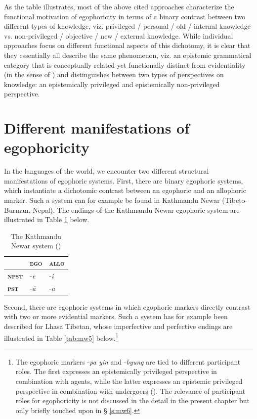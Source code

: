 \documentclass[output=paper]{langsci/langscibook}
\begin{document}
As the table illustrates, most of the above cited approaches characterize the functional motivation of egophoricity in terms of a binary contrast between two different types of knowledge, viz. privileged / personal / old / internal knowledge vs. non-privileged / objective / new / external knowledge. While individual approaches focus on different functional aspects of this dichotomy, it is clear that they essentially all describe the same phenomenon, viz. an epistemic grammatical category that is conceptually related yet functionally distinct from evidentiality (in the sense of \citealt{Aikhenvald2004}) and distinguishes between two types of perspectives on knowledge: an epistemically privileged and epistemically non-privileged perspective.
 
\section{Different manifestations of egophoricity}\label{s:mw3} 

In the languages of the world, we encounter two different structural manifestations of egophoric systems. First, there are binary egophoric systems, which instantiate a dichotomic contrast between an egophoric and an allophoric marker. Such a system can for example be found in Kathmandu Newar (Tibeto-Burman, Nepal). The endings of the Kathmandu Newar egophoric system are illustrated in Table \ref{tab:mw4} below.

\begin{table}
\begin{tabularx}{.70\textwidth}{XXX}
\hline
& \textbf{\textsc{ego}} & \textbf{\textsc{allo}}\\
\hline
\textbf{\textsc{npst}} & -\textit{e} & -\textit{i}\\
\textbf{\textsc{pst}} & -\textit{ā} & -\textit{a}\\
\hline
\end{tabularx}
\caption{The Kathmandu Newar system (\citealt{Hargreaves2005})}
\label{tab:mw4}
\end{table}

Second, there are egophoric systems in which egophoric markers directly contrast with two or more evidential markers. Such a system has for example been described for Lhasa Tibetan, whose imperfective and perfective endings are illustrated in Table \ref{tab:mw5} below.\footnote{The egophoric markers -\textit{pa yin} and -\textit{byung} are tied to different participant roles. The first expresses an epistemically privileged perspective in combination with agents, while the latter expresses an epistemic privileged perspective in combination with undergoers (\citealt{WidmerZuniga2017}). The relevance of participant roles for egophoricity is not discussed in the detail in the present chapter but only briefly touched upon in § \ref{s:mw6}.}
\end{document}
